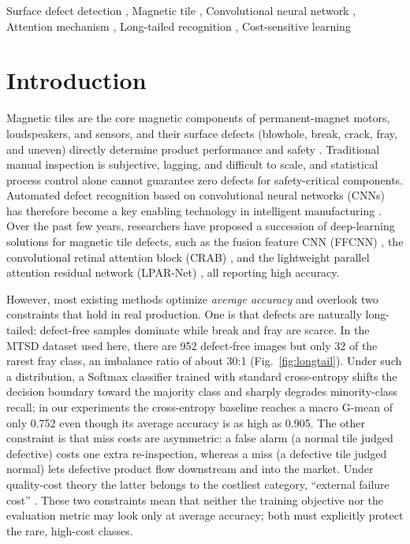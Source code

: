 \documentclass[a4paper,fleqn]{cas-sc}
\begin{document}
\begin{sloppypar}
	\begin{keywords}
		Surface defect detection \sep
		Magnetic tile \sep
		Convolutional neural network \sep
		Attention mechanism \sep
		Long-tailed recognition \sep
		Cost-sensitive learning
	\end{keywords}

	\maketitle

	\section{Introduction}
	\label{sec:intro}

	\par{
		Magnetic tiles are the core magnetic components of permanent-magnet motors, loudspeakers, and sensors, and their surface defects (blowhole, break, crack, fray, and uneven) directly determine product performance and safety \citep{huang2020surface}. Traditional manual inspection is subjective, lagging, and difficult to scale, and statistical process control \citep{montgomery2013introduction} alone cannot guarantee zero defects for safety-critical components. Automated defect recognition based on convolutional neural networks (CNNs) has therefore become a key enabling technology in intelligent manufacturing \citep{xie2021ffcnn,chen2021surface}. Over the past few years, researchers have proposed a succession of deep-learning solutions for magnetic tile defects, such as the fusion feature CNN (FFCNN) \citep{xie2021ffcnn}, the convolutional retinal attention block (CRAB) \citep{li2024attention}, and the lightweight parallel attention residual network (LPAR-Net) \citep{lv2024lightweight}, all reporting high accuracy.
	}

	\par{
		However, most existing methods optimize \emph{average accuracy} and overlook two constraints that hold in real production. One is that defects are naturally long-tailed: defect-free samples dominate while break and fray are scarce. In the MTSD dataset \citep{huang2020surface} used here, there are 952 defect-free images but only 32 of the rarest fray class, an imbalance ratio of about 30:1 (Fig.~\ref{fig:longtail}). Under such a distribution, a Softmax classifier trained with standard cross-entropy shifts the decision boundary toward the majority class and sharply degrades minority-class recall; in our experiments the cross-entropy baseline reaches a macro G-mean of only 0.752 even though its average accuracy is as high as 0.905. The other constraint is that miss costs are asymmetric: a false alarm (a normal tile judged defective) costs one extra re-inspection, whereas a miss (a defective tile judged normal) lets defective product flow downstream and into the market. Under quality-cost theory the latter belongs to the costliest category, ``external failure cost'' \citep{juran1993quality}. These two constraints mean that neither the training objective nor the evaluation metric may look only at average accuracy; both must explicitly protect the rare, high-cost classes.
	}


\end{sloppypar}
\end{document}
